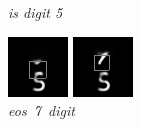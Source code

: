 \documentclass{article} %
\begin{document}
\begin{figure}[t]
  \caption{\textit{is digit 5}}
\endminipage\hfill
{}
  \includegraphics[width=\linewidth]{figures/5-7-17.png}
  \caption{\mbox{\textit{eos 7 digit}}}
\endminipage\hfill
{}
  \includegraphics[width=\linewidth]{figures/5-7-22.png}

\end{figure}
\end{document}
